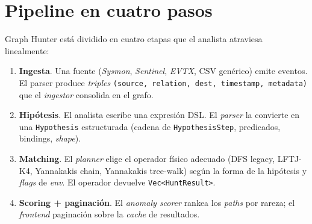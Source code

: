 \section{Pipeline en cuatro pasos}

Graph Hunter está dividido en cuatro etapas que el analista atraviesa
linealmente:

\begin{enumerate}
    \item \textbf{Ingesta}. Una fuente (\emph{Sysmon}, \emph{Sentinel},
    \emph{EVTX}, CSV genérico) emite eventos. El parser produce
    \emph{triples} \texttt{(source, relation, dest, timestamp,
    metadata)} que el \emph{ingestor} consolida en el grafo.
    \item \textbf{Hipótesis}. El analista escribe una expresión DSL.
    El \emph{parser} la convierte en una \texttt{Hypothesis}
    estructurada (cadena de \texttt{HypothesisStep}, predicados,
    bindings, \emph{shape}).
    \item \textbf{Matching}. El \emph{planner} elige el operador
    físico adecuado (DFS legacy, LFTJ-K4, Yannakakis chain,
    Yannakakis tree-walk) según la forma de la hipótesis y \emph{flags}
    de \emph{env}. El operador devuelve \texttt{Vec<HuntResult>}.
    \item \textbf{Scoring + paginación}. El \emph{anomaly scorer}
    rankea los \emph{paths} por rareza; el \emph{frontend} paginación
    sobre la \emph{cache} de resultados.
\end{enumerate}

